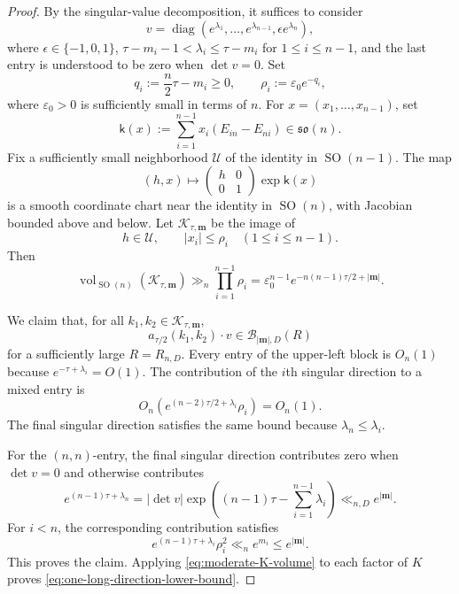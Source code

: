\documentclass[reqno,11pt]{amsart}
\numberwithin{equation}{section}
\theoremstyle{definition}
\theoremstyle{remark}
\newcommand{\op}{\operatorname}
\newcommand{\SO}{\op{SO}}
\begin{document}
\begin{proof}
By the singular-value decomposition, it suffices to consider
$$
v=
\operatorname{diag}
\left(e^{\lambda_1},\ldots,e^{\lambda_{n-1}},
\epsilon e^{\lambda_n}\right),
$$
where $\epsilon\in\{-1,0,1\}$,
$\tau-m_i-1<\lambda_i\le\tau-m_i$ for $1\le i\le n-1$,
and the last entry is understood to be zero when $\det v=0$.
Set
$$
q_i:=\frac n2\tau-m_i\ge0,
\qquad
\rho_i:=\varepsilon_0e^{-q_i},
$$
where $\varepsilon_0>0$ is sufficiently small in terms of $n$. For
$x=(x_1,\ldots,x_{n-1})$, set
$$
\mathsf k(x):=\sum_{i=1}^{n-1}x_i(E_{in}-E_{ni})
\in\mathfrak{so}(n).
$$
Fix a sufficiently small neighborhood $\mathscr U$ of the
identity in $\SO(n-1)$. The map
$$
(h,x)\mapsto
\begin{pmatrix}h&0\\0&1\end{pmatrix}\exp\mathsf k(x)
$$
is a smooth coordinate chart near the identity in $\SO(n)$, with
Jacobian bounded above and below. Let $\mathcal K_{\tau,\mathbf m}$ be
the image of
$$
h\in\mathscr U,
\qquad
|x_i|\le\rho_i\quad(1\le i\le n-1).
$$
Then
\begin{equation}\label{eq:moderate-K-volume}
\operatorname{vol}_{\SO(n)}(\mathcal K_{\tau,\mathbf m})
\gg_n
\prod_{i=1}^{n-1}\rho_i
=
\varepsilon_0^{n-1}e^{-n(n-1)\tau/2+|\mathbf m|}.
\end{equation}

We claim that, for all $k_1,k_2\in\mathcal K_{\tau,\mathbf m}$,
$$
a_{\tau/2}(k_1,k_2)\cdot v
\in\mathcal B_{|\mathbf m|,D}(R)
$$
for a sufficiently large $R=R_{n,D}$. Every entry of the upper-left block is
$O_n(1)$ because $e^{-\tau+\lambda_i}=O(1)$. The contribution of the
$i$th singular direction to a mixed entry is
$$
O_n\left(e^{(n-2)\tau/2+\lambda_i}\rho_i\right)
=O_n(1).
$$
The final singular direction satisfies the same bound because
$\lambda_n\le\lambda_i$.

For the $(n,n)$-entry, the final singular direction contributes zero
when $\det v=0$ and otherwise contributes
$$
e^{(n-1)\tau+\lambda_n}
=
|\det v|
\exp\left((n-1)\tau-\sum_{i=1}^{n-1}\lambda_i\right)
\ll_{n,D}e^{|\mathbf m|}.
$$
For $i<n$, the corresponding contribution satisfies
$$
e^{(n-1)\tau+\lambda_i}\rho_i^2
\ll_n
e^{m_i}
\le e^{|\mathbf m|}.
$$
This proves the claim. Applying \eqref{eq:moderate-K-volume} to each factor of $K$ proves
\eqref{eq:one-long-direction-lower-bound}.
\end{proof}
\end{document}
